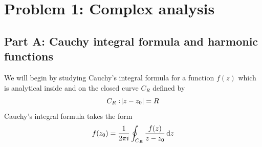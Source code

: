 \documentclass[12pt,twoside]{article}
\begin{document}

\section*{Problem 1: Complex analysis}
\subsection*{Part A: Cauchy integral formula and harmonic functions}
We will begin by studying Cauchy's integral formula for a function $f(z)$ which is analytical inside and on the closed curve $C_R$ defined by
\begin{equation}
  C_R: \abs{z-z_0}=R \label{contour}
\end{equation}
Cauchy's integral formula takes the form
\begin{equation}
  f(z_0) = \frac{1}{2\pi i} \oint_{C_R} \frac{f(z)}{z-z_0}\dif z \label{CIF}
\end{equation}
\end{document}
